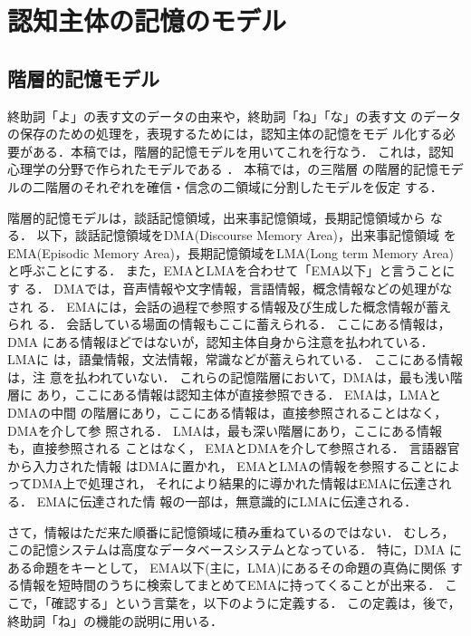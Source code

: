 \section{認知主体の記憶のモデル} \label{bconcept}
\subsection{階層的記憶モデル} \label{class}
終助詞「よ」の表す文のデータの由来や，終助詞「ね」「な」の表す文
のデータの保存のための処理を，表現するためには，認知主体の記憶をモデ
ル化する必要がある．本稿では，階層的記憶モデルを用いてこれを行なう．
これは，認知心理学の分野で作られたモデルである
\cite{koyazu85}\nocite{tanaka92}．  本稿では，\cite{kinsui92}の三階層
の階層的記憶モデルの二階層のそれぞれを確信・信念の二領域に分割したモデルを仮定
する．
 
階層的記憶モデルは，談話記憶領域，出来事記憶領域，長期記憶領域から
なる．  以下，談話記憶領域をDMA(Discourse Memory Area)，出来事記憶領域
をEMA(Episodic Memory Area)，長期記憶領域をLMA(Long term Memory Area)
と呼ぶことにする．  また，EMAとLMAを合わせて「EMA以下」と言うことにす
る．  DMAでは，音声情報や文字情報，言語情報，概念情報などの処理がなされ
る．  EMAには，会話の過程で参照する情報及び生成した概念情報が蓄えられ
る．  会話している場面の情報もここに蓄えられる．  ここにある情報は，DMA
にある情報ほどではないが，認知主体自身から注意を払われている．  LMAに
は，語彙情報，文法情報，常識などが蓄えられている．  ここにある情報は，注
意を払われていない．  これらの記憶階層において，DMAは，最も浅い階層に
あり，ここにある情報は認知主体が直接参照できる．  EMAは，LMAとDMAの中間
の階層にあり，ここにある情報は，直接参照されることはなく，DMAを介して参
照される．  LMAは，最も深い階層にあり，ここにある情報も，直接参照される
ことはなく， EMAとDMAを介して参照される．  言語器官から入力された情報
はDMAに置かれ， EMAとLMAの情報を参照することによってDMA上で処理され，
それにより結果的に導かれた情報はEMAに伝達される．  EMAに伝達された情
報の一部は，無意識的にLMAに伝達される．

さて，情報はただ来た順番に記憶領域に積み重ねているのではない．  むしろ，
この記憶システムは高度なデータベースシステムとなっている．  特に，DMA
にある命題をキーとして， EMA以下(主に，LMA)にあるその命題の真偽に関係
する情報を短時間のうちに検索してまとめてEMAに持ってくることが出来る．
ここで，「確認する」という言葉を，以下のように定義する．
この定義は，後で，終助詞「ね」の機能の説明に用いる．
